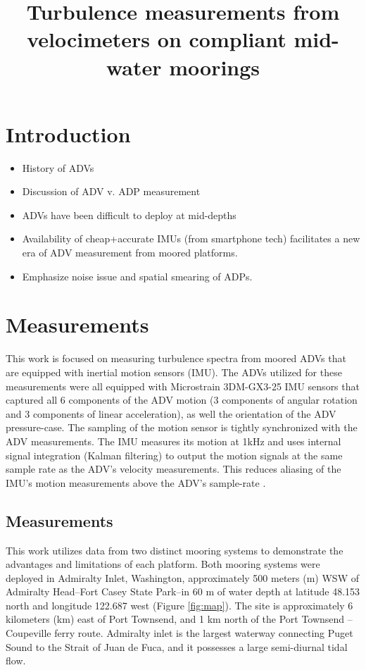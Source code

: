 \documentclass[twocol]{ametsoc}
\title{Turbulence measurements from velocimeters on compliant mid-water moorings}
\affiliation{}
\begin{document}
\maketitle


\section{Introduction}

\begin{itemize}
\item History of ADVs
\item Discussion of ADV v. ADP measurement
\item ADVs have been difficult to deploy at mid-depths
\item Availability of cheap+accurate IMUs (from smartphone tech) facilitates a new era of ADV measurement from moored platforms.
\item Emphasize noise issue and spatial smearing of ADPs.
\end{itemize}

\section{Measurements}
\label{sec:meas}

This work is focused on measuring turbulence spectra from moored ADVs that are equipped with inertial motion sensors (IMU). The ADVs utilized for these measurements were all equipped with Microstrain 3DM-GX3-25 IMU sensors that captured all 6 components of the ADV motion (3 components of angular rotation and 3 components of linear acceleration), as well the orientation of the ADV pressure-case. The sampling of the motion sensor is tightly synchronized with the ADV measurements. The IMU measures its motion at 1kHz and uses internal signal integration (Kalman filtering) to output the motion signals at the same sample rate as the ADV's velocity measurements. This reduces aliasing of the IMU's motion measurements above the ADV's sample-rate \citep[]{3DM-GX3_coning_sculling}.

\subsection{Measurements}

This work utilizes data from two distinct mooring systems to demonstrate the advantages and limitations of each platform. Both mooring systems were deployed in Admiralty Inlet, Washington, approximately 500 meters (m) WSW of Admiralty Head--Fort Casey State Park--in 60 m of water depth at latitude 48.153 north and longitude 122.687 west (Figure \ref{fig:map}). The site is approximately 6 kilometers (km) east of Port Townsend, and 1 km north of the Port Townsend -- Coupeville ferry route.  
Admiralty inlet is the largest waterway connecting Puget Sound to the Strait of Juan de Fuca, and it possesses a large semi-diurnal tidal flow.
\end{document}
